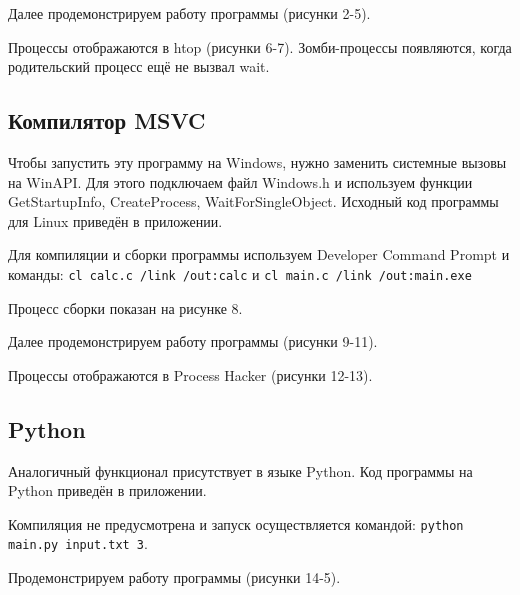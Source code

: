 \FloatBarrier

Далее продемонстрируем работу программы (рисунки 2-5).

\FloatBarrier

Процессы отображаются в htop (рисунки 6-7). Зомби-процессы появляются, когда родительский процесс ещё не вызвал wait.

\FloatBarrier
\clearpage


\subsection{Компилятор MSVC}

Чтобы запустить эту программу на Windows, нужно заменить системные вызовы на WinAPI. Для этого подключаем файл Windows.h и используем функции GetStartupInfo, CreateProcess, WaitForSingleObject. Исходный код программы для Linux приведён в приложении.

Для компиляции и сборки программы используем Developer Command Prompt и команды: \texttt{cl calc.c /link /out:calc} и \texttt{cl main.c /link /out:main.exe}

Процесс сборки показан на рисунке 8.

\FloatBarrier

Далее продемонстрируем работу программы (рисунки 9-11).

\FloatBarrier

Процессы отображаются в Process Hacker (рисунки 12-13).

\FloatBarrier
\clearpage


\subsection{Python}

Аналогичный функционал присутствует в языке Python. Код программы на Python приведён в приложении. 

Компиляция не предусмотрена и запуск осуществляется командой: \texttt{python main.py input.txt 3}.

Продемонстрируем работу программы (рисунки 14-5).

